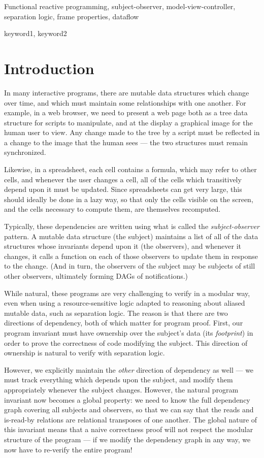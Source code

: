 \documentclass[preprint,natbib]{sigplanconf}
\begin{document}

\terms
Functional reactive programming, subject-observer, model-view-controller,
separation logic, frame properties, dataflow

\keywords
keyword1, keyword2

\section{Introduction}

In many interactive programs, there are mutable data structures which
change over time, and which must maintain some relationships with one
another. For example, in a web browser, we need to present a web page
both as a tree data structure for scripts to manipulate, and at the
display a graphical image for the human user to view. Any change made
to the tree by a script must be reflected in a change to the image
that the human sees --- the two structures must remain synchronized.

Likewise, in a spreadsheet, each cell contains a formula, which may
refer to other cells, and whenever the user changes a cell, all of the
cells which transitively depend upon it must be updated. Since
spreadsheets can get very large, this should ideally be done in a lazy
way, so that only the cells visible on the screen, and the cells
necessary to compute them, are themselves recomputed.

Typically, these dependencies are written using what is called the
\emph{subject-observer} pattern. A mutable data structure (the
subject) maintains a list of all of the data structures whose
invariants depend upon it (the observers), and whenever it changes, it
calls a function on each of those observers to update them in response
to the change. (And in turn, the observers of the subject may be
subjects of still other observers, ultimately forming DAGs of
notifications.)

While natural, these programs are very challenging to verify in a
modular way, even when using a resource-sensitive logic adapted to
reasoning about aliased mutable data, such as separation logic. The
reason is that there are two directions of dependency, both of which
matter for program proof. First, our program invariant must have
ownership over the subject's data (its \emph{footprint}) in order to
prove the correctness of code modifying the subject. This direction
of ownership is natural to verify with separation logic. 

However, we explicitly maintain the \emph{other} direction of
dependency as well --- we must track everything which depends upon the
subject, and modify them appropriately whenever the subject changes.
However, the natural program invariant now becomes a global property:
we need to know the full dependency graph covering all subjects and
observers, so that we can say that the reads and is-read-by relations
are relational transposes of one another. The global nature of this
invariant means that a naive correctness proof will not respect the
modular structure of the program --- if we modify the dependency graph
in any way, we now have to re-verify the entire program!
\end{document}
